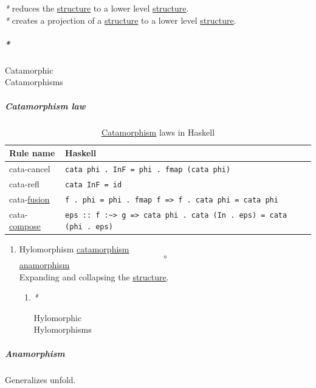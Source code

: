 \documentclass[11pt]{article}
\begin{document}
\emph{*} reduces the \hyperref[org8051f61]{structure} to a lower level \hyperref[org8051f61]{structure}.\\
\emph{*} creates a projection of a \hyperref[org8051f61]{structure} to a lower level \hyperref[org8051f61]{structure}.\\

\subparagraph{\emph{*}}
\label{sec:org5dd6680}

\label{org84b324c}Catamorphic\\
\label{orgcc6c629}Catamorphisms\\

\subparagraph{\label{org75fbb10}Catamorphism law}
\label{sec:org8c1b3d7}
\begin{table}[htbp]
\caption{\label{tab:catamorphism-law-in-haskell}\hyperref[orgefe2953]{Catamorphism} laws in Haskell}
\centering
\begin{tabular}{ll}
Rule name & Haskell\\
\hline
cata-cancel & \texttt{cata phi . InF = phi . fmap (cata phi)}\\
cata-refl & \texttt{cata InF = id}\\
cata-\hyperref[org738c534]{fusion} & \texttt{f . phi = phi . fmap f => f . cata phi = cata phi}\\
cata-\hyperref[org5956f19]{compose} & \texttt{eps :: f :\textasciitilde{}> g => cata phi . cata (In . eps) = cata (phi . eps)}\\
\end{tabular}
\end{table}

\begin{enumerate}
\item \label{org4c72efe}Hylomorphism
\label{sec:org4d0eb93}
\hyperref[orgefe2953]{catamorphism} $$ \circ $$ \hyperref[org91e372a]{anamorphism}\\

Expanding and collapsing the \hyperref[org8051f61]{structure}.\\

\begin{enumerate}
\item \emph{*}
\label{sec:orgf352432}

\label{org0794559}Hylomorphic\\
\label{org1b732e6}Hylomorphisms\\
\end{enumerate}
\end{enumerate}

\subparagraph{\label{org91e372a}Anamorphism}
\label{sec:orgc8b44ea}
Generalizes unfold.\\
\end{document}
